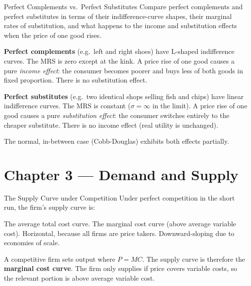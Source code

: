 \documentclass[paper=a5]{scrartcl}
\begin{document}
\begin{question}[type=open]{Perfect Complements vs.\ Perfect Substitutes}
Compare perfect complements and perfect substitutes in terms of their
indifference-curve shapes, their marginal rates of substitution, and
what happens to the income and substitution effects when the price of
one good rises.

\answerlines[7]

\begin{solution}
  \textbf{Perfect complements} (e.g.\ left and right shoes) have
  L-shaped indifference curves. The MRS is zero except at the kink.
  A price rise of one good causes a pure \emph{income effect}: the
  consumer becomes poorer and buys less of both goods in fixed proportion.
  There is no substitution effect.

  \textbf{Perfect substitutes} (e.g.\ two identical shops selling fish and
  chips) have linear indifference curves. The MRS is constant ($\sigma = \infty$
  in the limit). A price rise of one good causes a pure \emph{substitution
  effect}: the consumer switches entirely to the cheaper substitute. There is
  no income effect (real utility is unchanged).

  The normal, in-between case (Cobb-Douglas) exhibits both effects partially.
\end{solution}
\end{question}


\section{Chapter 3 — Demand and Supply}

\begin{question}[type=mc]{The Supply Curve under Competition}
Under perfect competition in the short run, the firm's supply curve is:
\begin{choices}
  \choice        The average total cost curve.
  \correctchoice The marginal cost curve (above average variable cost).
  \choice        Horizontal, because all firms are price takers.
  \choice        Downward-sloping due to economies of scale.
\end{choices}
\begin{solution}
  A competitive firm sets output where $P = MC$. The supply curve is therefore
  the \textbf{marginal cost curve}. The firm only supplies if price covers
  variable costs, so the relevant portion is above average variable cost.
\end{solution}
\end{question}
\end{document}
